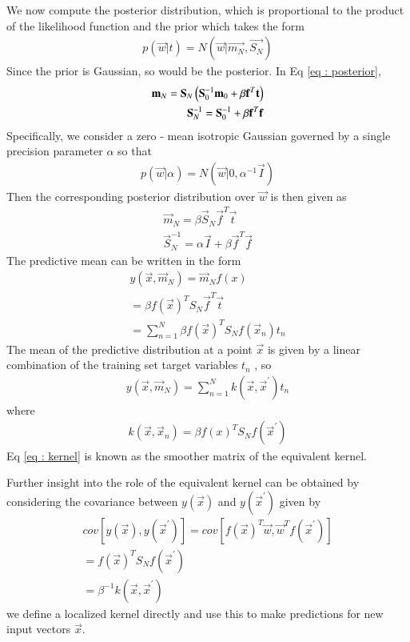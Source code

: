 \documentclass[journal,12pt,twocolumn]{IEEEtran}
\begin{document}
We now compute the posterior distribution, which is proportional to the product of the likelihood function and the prior which takes the form
\begin{align}
    p(\vec{w} | t) = N(\vec{w} | \vec{m_{N}},\vec{S_{N}}) \label{eq : posterior}
\end{align}
Since the prior is Gaussian, so would be the posterior.
In Eq \eqref{eq : posterior},
\begin{align}
       \mathbf{m}_{N} = \mathbf{S}_{N}\left(\mathbf{S}_{0}^{-1}\mathbf{m}_{0} + \beta \mathbf{f}^T \mathbf{t}\right)\\
       \mathbf{S}_{N}^{-1} = \mathbf{S}_{0}^{-1} + \beta \mathbf{f}^{T} \mathbf{f}
\end{align}
Specifically, we consider a zero - mean isotropic Gaussian governed by a single precision parameter $\alpha$ so that
\begin{align}
    p(\vec{w} | \alpha) = N(\vec{w} | 0, \alpha^{-1} \vec{I})
\end{align}
Then the corresponding posterior distribution over $\vec{w}$ is then given as
\begin{align}
    \vec{m}_{N} = \beta\vec{S}_{N} \vec{f}^T \vec{t} \label{eq : mean}\\
    \vec{S}_{N}^{-1} = \alpha \vec{I} + \beta \vec{f}^{T} \vec{f}
\end{align}
The predictive mean can be written in the form
\begin{multline}
     y(\vec{x},\vec{m}_{N}) = \vec{m}_{N} f(x)\\
        = \beta f(\vec{x})^{T} S_{N} \vec{f}^{T} \vec{t} \\
        = \sum_{n=1}^{N} \beta f(\vec{x})^{T} S_{N} f(\vec{x}_{n}) t_{n}
\end{multline}
The mean of the predictive distribution at a point $\vec{x}$ is given by a linear combination of the training set target variables $t_{n}$ , so
\begin{align}
    y(\vec{x},\vec{m}_{N}) = \sum_{n=1}^{N} k(\vec{x},\vec{x}^{'}) t_{n}
\end{align}
where
\begin{align}
    k(\vec{x},\vec{x}_{n}) = \beta f(x)^{T} S_{N} f(\vec{x}^{'}) \label{eq : kernel}
\end{align}
Eq \eqref{eq : kernel} is known as the smoother matrix of the equivalent kernel.

Further insight into the role of the equivalent kernel can be obtained by considering the covariance between $y(\vec{x})$ and $y(\vec{x}^{'})$ given by
\begin{align}
    cov[y(\vec{x}),y(\vec{x}^{'})] = cov[f(\vec{x})^{T}\vec{w}, \vec{w}^{T}f(\vec{x}^{'})]\\
         = f(\vec{x})^{T} S_{N} f(\vec{x}^{'})\\
         = \beta^{-1}k(\vec{x},\vec{x}^{'})
\end{align}
we define a localized kernel directly and use this to make predictions for new input vectors $\vec{x}$.
\end{document}
